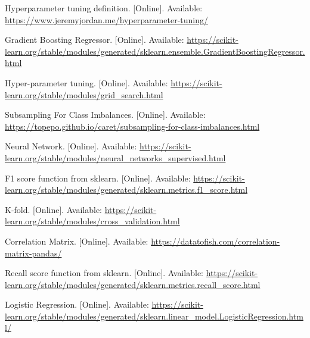 \documentclass[conference]{IEEEtran}
\begin{document}
\begin{thebibliography}{99}
 Hyperparameter tuning definition. [Online]. Available: \url{https://www.jeremyjordan.me/hyperparameter-tuning/}

 Gradient Boosting Regressor. [Online]. Available: \url{https://scikit-learn.org/stable/modules/generated/sklearn.ensemble.GradientBoostingRegressor.html}

 Hyper-parameter tuning. [Online]. Available: \url{https://scikit-learn.org/stable/modules/grid_search.html}

 Subsampling For Class Imbalances. [Online]. Available: \url{https://topepo.github.io/caret/subsampling-for-class-imbalances.html}

 Neural Network. [Online]. Available: \url{https://scikit-learn.org/stable/modules/neural_networks_supervised.html}

 F1 score function from sklearn. [Online]. Available: \url{https://scikit-learn.org/stable/modules/generated/sklearn.metrics.f1_score.html}

 K-fold. [Online]. Available: \url{https://scikit-learn.org/stable/modules/cross_validation.html}

 Correlation Matrix. [Online]. Available: \url{https://datatofish.com/correlation-matrix-pandas/}

 Recall score function from sklearn. [Online]. Available: \url{https://scikit-learn.org/stable/modules/generated/sklearn.metrics.recall_score.html}

 Logistic Regression. [Online]. Available: \url{https://scikit-learn.org/stable/modules/generated/sklearn.linear_model.LogisticRegression.html/}

\end{thebibliography}
\end{document}
